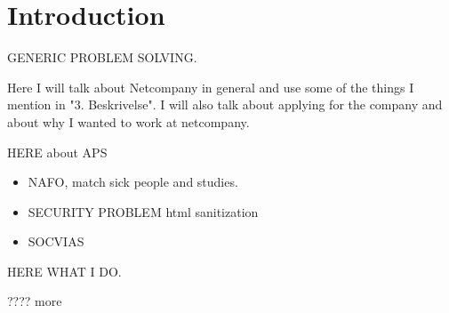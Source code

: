 \documentclass[../main.tex]{subfiles}
\begin{document}
\section{Introduction}

GENERIC PROBLEM SOLVING.  

Here I will talk about Netcompany in general and use some of the things I mention in "3. Beskrivelse". I will also talk about applying for the company and about why I wanted to work at netcompany.  

HERE about APS 

\begin{itemize}
    \item NAFO, match sick people and studies. 
    \item SECURITY PROBLEM html sanitization 
    \item SOCVIAS 
\end{itemize}
HERE WHAT I DO. 


    ???? more 
\end{document}
